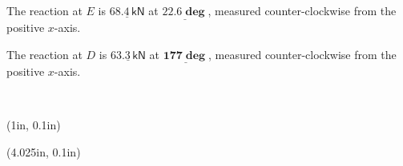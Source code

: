 \documentclass[10pt,oneside]{article}
\def\scale{1}
\begin{document}
\begin{textblock*}{6.75in}
  \parb\large\centering
      The reaction at $E$ is $\underline{\bm{68.4\,\mathsf{kN}}}$ at  $\underline{\bm{22.6\deg}}$, measured counter-clockwise from the positive $x$-axis.
      
      \parm
      
      The reaction at $D$ is $\underline{\bm{63.3\,\mathsf{kN}}}$ at  $\underline{\bm{177\deg}}$, measured counter-clockwise from the positive $x$-axis.
\end{textblock*}


~\newpage
\begin{textblock*}{2.5in}(1in, 0.1in)
\end{textblock*}
\begin{textblock*}{3.75in}(4.025in, 0.1in)
	\cbox{
    \centering
    \def\scale{0.65}
    
  }
\end{textblock*}
\end{document}
